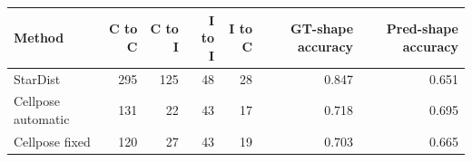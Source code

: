 \begin{tabular}{lrrrrrr}
\toprule
Method & C to C & C to I & I to I & I to C & GT-shape accuracy & Pred-shape accuracy \\
\midrule
StarDist & 295 & 125 & 48 & 28 & 0.847 & 0.651 \\
Cellpose automatic & 131 & 22 & 43 & 17 & 0.718 & 0.695 \\
Cellpose fixed & 120 & 27 & 43 & 19 & 0.703 & 0.665 \\
\bottomrule
\end{tabular}
